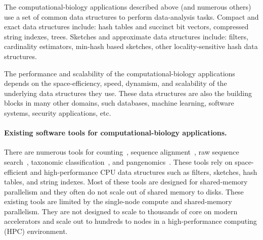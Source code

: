 The computational-biology applications described above (and numerous others)  use a set of common data structures to perform data-analysis tasks.
Compact and exact data structures include: hash tables and succinct bit vectors, compressed string indexes, trees.
Sketches and approximate data structures include: filters, cardinality estimators,  min-hash based sketches, other locality-sensitive hash data structures.

The performance and scalability of the computational-biology applications
depends on the space-efficiency, speed, dynamism, and scalability of the
underlying data structures they use. These data structures are also the building
blocks in many other domains, such databases, machine learning, software
systems, security applications, etc.


\paragraph{Existing software tools for computational-biology applications.}

There are numerous tools for \kmer counting~\cite{MarccaisKi11,PandeyBJP17a}, sequence alignment~\cite{altschul1990basic,kielbasa2011adaptive,li2018minimap2,schwartz2003human}, raw sequence search~\cite{solomon2016fast,PandeyABFJP18Cell}, taxonomic classification~\cite{wood2014kraken,wood2019improved}, and pangenomics~\cite{garrison2018variation,pandey2021variantstore}. These tools rely on space-efficient and high-performance CPU data structures such as filters, sketches, hash tables, and string indexes. Most of these tools are designed for shared-memory parallelism and they often do not scale out of shared memory to disks.
These existing tools are limited by the single-node compute and shared-memory parallelism. They are not designed to scale to thousands of core on modern accelerators and scale out to hundreds to nodes in a high-performance computing (HPC) environment.
%


